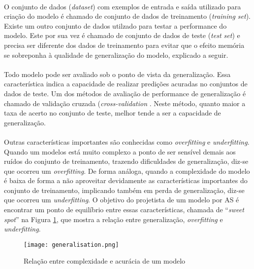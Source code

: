 \paragraph{} O conjunto de dados (\textit{dataset}) com exemplos de entrada e saída utilizado para criação do modelo é chamado de conjunto de dados de treinamento (\textit{training set}). Existe um outro conjunto de dados utilzado para testar a performance do modelo. Este por sua vez é chamado de conjunto de dados de teste (\textit{test set}) e precisa ser diferente dos dados de treinamento para evitar que o efeito memória se sobreponha à qualidade de generalização do modelo, explicado a seguir.

\paragraph{} Todo modelo pode ser avaliado sob o ponto de vista da generalização. Essa característica indica a capacidade de realizar predições acuradas no conjuntos de dados de teste. Um dos métodos de avaliação de performance de generalização é chamado de validação cruzada (\textit{cross-validation} \cite{muller2016introduction}. Neste método, quanto maior a taxa de acerto no conjunto de teste, melhor tende a ser a capacidade de generalização.

\paragraph{} Outras características importantes são conhecidas como \textit{overfitting} e \textit{underfitting}. Quando um modelos está muito complexo a ponto de ser sensível demais aos ruídos do conjunto de treinamento, trazendo dificuldades de generalização, diz-se que ocorreu um \textit{overfitting}. De forma análoga, quando a complexidade do modelo é baixa de forma a não aproveitar devidamente as características importantes do conjunto de treinamento, implicando também em perda de generalização, diz-se que ocorreu um \textit{underfitting}. O objetivo do projetista de um modelo por AS é encontrar um ponto de equilíbrio entre essas características, chamada de ``\textit{sweet spot}'' na Figura \ref{fig:6}, que mostra a relação entre generalização, \textit{overfitting} e \textit{underfitting}.

\begin{figure}[!htb]
    \texttt{[image: generalisation.png]}
    \centering
    \caption{Relação entre complexidade e acur\'acia de um modelo \cite{muller2016introduction}}
    \label{fig:6}
\end{figure}

